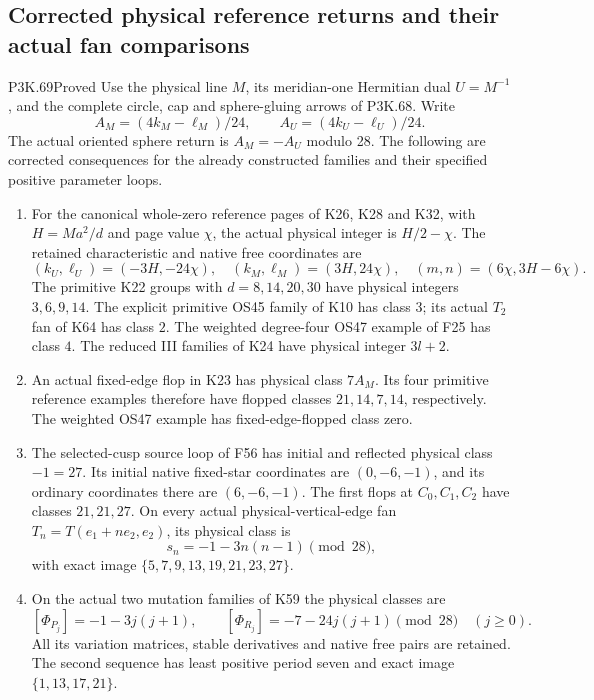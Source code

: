 \subsection{Corrected physical reference returns and their actual fan comparisons}
\begin{statement}{P3K.69}{Proved}
Use the physical line \(M\), its meridian-one Hermitian dual
\(U=M^{-1}\), and the complete circle, cap and sphere-gluing arrows
of P3K.68. Write
\[
 A_M=(4k_M-\ell_M)/24,\qquad A_U=(4k_U-\ell_U)/24.
\]
The actual oriented sphere return is \(A_M=-A_U\) modulo 28.
The following are corrected consequences for the already constructed
families and their specified positive parameter loops.

\begin{enumerate}
\item For the canonical whole-zero reference pages of K26, K28 and
K32, with \(H=Ma^2/d\) and page value \(\chi\), the actual physical
integer is \(H/2-\chi\). The retained characteristic and native free
coordinates are
\[
 (k_U,\ell_U)=(-3H,-24\chi),\quad
 (k_M,\ell_M)=(3H,24\chi),\quad
 (m,n)=(6\chi,3H-6\chi).
\]
The primitive K22 groups with \(d=8,14,20,30\) have physical integers
\(3,6,9,14\). The explicit primitive OS45 family of K10 has class
\(3\); its actual \(T_2\) fan of K64 has class \(2\).
The weighted degree-four OS47 example of F25 has class \(4\).
The reduced III families of K24 have physical integer \(3l+2\).
\item An actual fixed-edge flop in K23 has physical class
\(7A_M\). Its four primitive reference examples therefore have
flopped classes \(21,14,7,14\), respectively. The weighted OS47
example has fixed-edge-flopped class zero.
\item The selected-cusp source loop of F56 has initial and reflected
physical class \(-1=27\). Its initial native fixed-star coordinates
are \((0,-6,-1)\), and its ordinary coordinates there are
\((6,-6,-1)\). The first flops at \(C_0,C_1,C_2\) have classes
\(21,21,27\). On every actual physical-vertical-edge fan
\(T_n=T(e_1+ne_2,e_2)\), its physical class is
\[
                  s_n=-1-3n(n-1)\pmod{28},
\]
with exact image \(\{5,7,9,13,19,21,23,27\}\).
\item On the actual two mutation families of K59 the physical classes
are
\[
 [\Phi_{P_j}]=-1-3j(j+1),\qquad
 [\Phi_{R_j}]=-7-24j(j+1)\pmod{28}\quad(j\geq0).
\]
All its variation matrices, stable derivatives and native free pairs
are retained. The second sequence has least positive period seven
and exact image \(\{1,13,17,21\}\).

\end{enumerate}
\end{statement}
